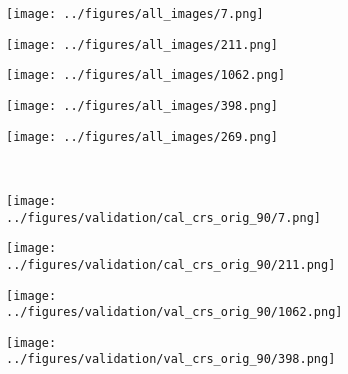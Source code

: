 \begin{figure}[h!]
\begin{subfigure}[b]{0.03\textwidth}
		\centering
	\end{subfigure}
	\hspace{0.05cm}
	\begin{subfigure}{0.18\textwidth}
		\centering
		\texttt{[image: ../figures/all\_images/7.png]}
		\label{fig:1}
	\end{subfigure}
	\begin{subfigure}{0.18\textwidth}
		\centering
		\texttt{[image: ../figures/all\_images/211.png]}
		\label{fig:1}
	\end{subfigure}
	\begin{subfigure}{0.18\textwidth}
		\centering
		\texttt{[image: ../figures/all\_images/1062.png]}
		\label{fig:1}
	\end{subfigure}
	\begin{subfigure}{0.18\textwidth}
		\centering
		\texttt{[image: ../figures/all\_images/398.png]}
		\label{fig:1}
	\end{subfigure}
	\begin{subfigure}{0.18\textwidth}
		\centering
		\texttt{[image: ../figures/all\_images/269.png]}
		\label{fig:1}
	\end{subfigure}
	\vspace{-0.35cm}
	\\
			\begin{subfigure}[b]{0.03\textwidth} %
		\centering
	\end{subfigure}
	\hspace{0.05cm}
	\begin{subfigure}{0.18\textwidth}
		\centering
		\texttt{[image: ../figures/validation/cal\_crs\_orig\_90/7.png]}
		\label{fig:1}
	\end{subfigure}
	\begin{subfigure}{0.18\textwidth}
		\centering
		\texttt{[image: ../figures/validation/cal\_crs\_orig\_90/211.png]}
		\label{fig:1}
	\end{subfigure}
	\begin{subfigure}{0.18\textwidth}
		\centering
		\texttt{[image: ../figures/validation/val\_crs\_orig\_90/1062.png]}
		\label{fig:1}
	\end{subfigure}
	\begin{subfigure}{0.18\textwidth}
		\centering
		\texttt{[image: ../figures/validation/val\_crs\_orig\_90/398.png]}

\end{subfigure}
\end{figure}

